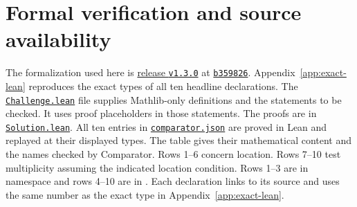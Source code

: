 \documentclass[11pt]{amsart}
\theoremstyle{definition}
\theoremstyle{remark}
\numberwithin{equation}{section}
\newcommand{\repositoryurl}{https://github.com/kimihiro64/Robin1984}
\newcommand{\proofrevision}{b359826e62c50b6cef55db4b2fcab793232498cc}
\newcommand{\codefile}[1]{%
  \href{\repositoryurl/blob/\proofrevision/#1}{\nolinkurl{#1}}}
\newcommand{\commitlink}[2]{%
  \href{\repositoryurl/commit/#1}{\texttt{#2}}}
\begin{document}
\section{Formal verification and source availability}
\label{sec:formalization-summary}

The formalization used here is
\href{\repositoryurl/releases/tag/v1.3.0}{release \texttt{v1.3.0}}
at \commitlink{\proofrevision}{b359826}. Appendix~\ref{app:exact-lean}
reproduces the exact types of all ten headline declarations. The
\codefile{Challenge.lean} file supplies Mathlib-only definitions and
the statements to be checked. It uses proof placeholders in those
statements. The proofs are in \codefile{Solution.lean}.
All ten entries in \codefile{comparator.json} are proved in Lean
and replayed at their displayed types. The table gives their
mathematical content and the names checked by Comparator.
Rows 1--6 concern location. Rows 7--10 test multiplicity assuming
the indicated location condition. Rows 1--3 are in namespace
 and rows 4--10 are in .
Each declaration links to its source and uses the same number
as the exact type in Appendix~\ref{app:exact-lean}.
\end{document}
